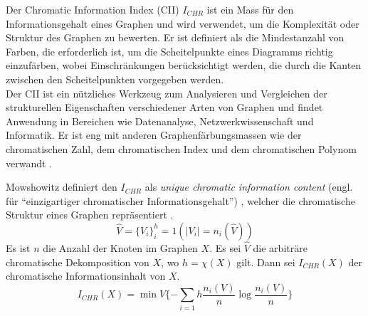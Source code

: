 Der Chromatic Information Index (CII) $ I_{CHR} $ ist ein Mass für den Informationsgehalt eines Graphen und wird verwendet, um die Komplexität oder Struktur des Graphen zu bewerten.
Er ist definiert als die Mindestanzahl von Farben, die erforderlich ist, um die Scheitelpunkte eines Diagramms richtig einzufärben, wobei Einschränkungen berücksichtigt werden,
die durch die Kanten zwischen den Scheitelpunkten vorgegeben werden. \\
Der CII ist ein nützliches Werkzeug zum Analysieren und Vergleichen der strukturellen Eigenschaften verschiedener Arten von Graphen und findet Anwendung in Bereichen wie Datenanalyse, Netzwerkwissenschaft und Informatik.
Er ist eng mit anderen Graphenfärbungsmassen wie der chromatischen Zahl, dem chromatischen Index und dem chromatischen Polynom verwandt \cite[p.~93ff]{bonchev_information_1985}.

Mowshowitz definiert den $ I_{CHR} $ als \textit{unique chromatic information content} (engl. für \enquote{einzigartiger chromatischer Informationsgehalt}) \cite[p.~13]{balaban_1983_2014}, welcher die chromatische Struktur eines Graphen repräsentiert \cite{mowshowitz_entropy_1968}.
\begin{equation}
    \hat{V} = \{ V_i \}^h_i=1(|V_i| = n_i(\hat{V}))
\end{equation}
Es ist $n$ die Anzahl der Knoten im Graphen $X$.
Es sei $\hat{V}$ die arbiträre chromatische Dekomposition von $X$, wo $h = \chi(X)$ gilt.
Dann sei $ I_{CHR}(X) $ der chromatische Informationsinhalt von $X$.
\begin{equation}
    I_{CHR}(X) = \min{V \{ -\sum_{i=1}{h}{\frac{n_i(V)}{n} \log \frac{n_i(V)}{n}} \} }
\end{equation}
